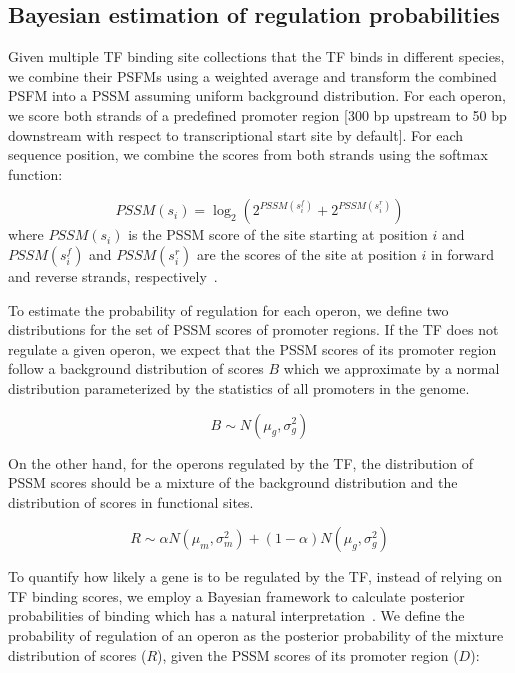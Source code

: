 \subsection{Bayesian estimation of regulation probabilities}

Given multiple TF binding site collections that the TF binds in different
species, we combine their PSFMs using a weighted average and transform the
combined PSFM into a PSSM assuming uniform background distribution. For each
operon, we score both strands of a predefined promoter region [300 bp upstream
to 50 bp downstream with respect to transcriptional start site by default]. For
each sequence position, we combine the scores from both strands using the
softmax function:

\begin{equation}
  PSSM(s_i) = \log_2 (2^{PSSM(s_i^f)} + 2^{PSSM(s_i^r)})
\end{equation}
where $PSSM(s_i )$ is the PSSM score of the site starting at position $i$ and
$PSSM(s_i^f)$ and $PSSM(s_i^r)$ are the scores of the site at position $i$ in
forward and reverse strands, respectively~\citep{hobbs2016bayesian}.

To estimate the probability of regulation for each operon, we define two
distributions for the set of PSSM scores of promoter regions. If the TF does
not regulate a given operon, we expect that the PSSM scores of its promoter
region follow a background distribution of scores $B$ which we approximate by a
normal distribution parameterized by the statistics of all promoters in the
genome.

\begin{equation}
  B \sim N(\mu_g, \sigma_g^2)
\end{equation}

On the other hand, for the operons regulated by the TF, the distribution of
PSSM scores should be a mixture of the background distribution and the
distribution of scores in functional sites.

\begin{equation}
R \sim \alpha N(\mu_m, \sigma_m^2) + (1-\alpha) N(\mu_g, \sigma_g^2)
\end{equation}

To quantify how likely a gene is to be regulated by the TF, instead of relying
on TF binding scores, we employ a Bayesian framework to calculate posterior
probabilities of binding which has a natural
interpretation~\citep{hobbs2016bayesian}. We define the probability of
regulation of an operon as the posterior probability of the mixture
distribution of scores ($R$), given the PSSM scores of its promoter region
($D$):

